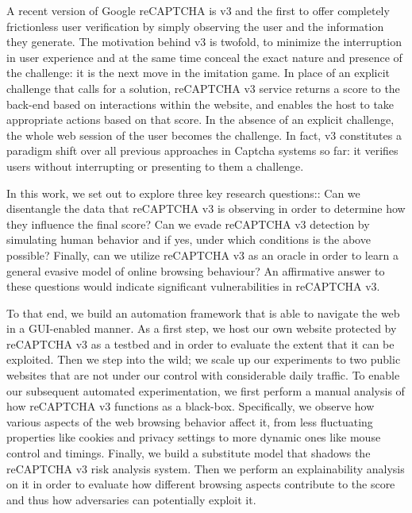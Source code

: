 A recent version of Google reCAPTCHA is v3 and the first to offer completely frictionless user verification by simply observing the user and the information they generate.
The motivation behind v3 is twofold, to minimize the interruption in user experience and at the same time conceal the exact nature and presence of the challenge: it is the next move in the imitation game.
In place of an explicit challenge that calls for a solution, reCAPTCHA v3 service returns a score to the back-end based on interactions within the website, and enables the host to take appropriate actions based on that score.
In the absence of an explicit challenge, the whole web session of the user becomes the challenge.
In fact, v3 constitutes a paradigm shift over all previous approaches in Captcha systems so far: it
verifies users without interrupting or presenting to them a challenge.

In this work, we set out to explore three key research questions::
Can we disentangle the data that reCAPTCHA v3 is observing in order to determine how they influence the final score?
Can we evade reCAPTCHA v3 detection by simulating human behavior and if yes, under which conditions is the above possible?
Finally, can we utilize reCAPTCHA v3 as an oracle in order to learn a general evasive model of online browsing behaviour?
An affirmative answer to these questions would indicate significant vulnerabilities in reCAPTCHA v3.

To that end, we build an automation framework that is able to navigate the web in a GUI-enabled manner.
As a first step, we host our own website protected by reCAPTCHA v3 as a testbed and in order to evaluate the extent that it can be exploited.
Then we step into the wild; we scale up our experiments to two public websites that are not under our control with considerable daily traffic.
To enable our subsequent automated experimentation, we first perform a manual analysis of how reCAPTCHA v3 functions as a black-box.
Specifically, we observe how various aspects of the web browsing behavior affect it, from less fluctuating properties like cookies and privacy settings to more dynamic ones like mouse control and timings.
Finally, we build a substitute model that shadows the reCAPTCHA v3 risk analysis system.
Then we perform an explainability analysis on it in order to evaluate how different browsing aspects contribute to the score and thus how adversaries can potentially exploit it.

